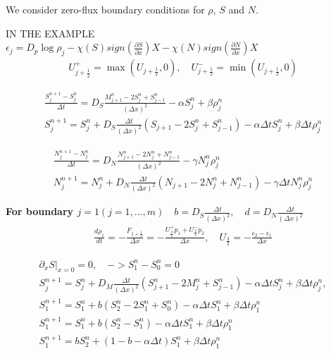 \documentclass[11pt,twoside]{article}
\numberwithin{equation}{section}
\begin{document}
We consider zero-flux boundary conditions for $\rho$, $S$ and $N$.








\iffalse
IN THE EXAMPLE\\
$\epsilon_j=D_p \log \rho_j-\chi(S) sign(\frac{\partial S}{\partial x})X-\chi(N) sign(\frac{\partial N}{\partial x})X$
\begin{eqnarray}
U^+_{j+\frac{1}{2}}=\max(U_{j+\frac{1}{2}},0), \quad U^-_{j+\frac{1}{2}}=\min (U_{j+\frac{1}{2}},0)
\end{eqnarray}

\begin{eqnarray}
\frac{S_j^{n+1}-S_j^n}{\Delta t}=D_S\frac{M_{j+1}^n-2S_j^n+S_{j-1}^n}{(\Delta x)^2}-\alpha S_j^n+\beta \rho_j^n\\
S_j^{n+1}=S_j^n+D_S \frac{\Delta t} {(\Delta x)^2}(S_{j+1}-2S_j^n+S_{j-1}^n)-\alpha \Delta t S_j^n+\beta \Delta t \rho_j^n
\end{eqnarray}


\begin{eqnarray}
\frac{N_j^{n+1}-N_j^n}{\Delta t}=D_N\frac{N_{j+1}^n-2N_j^n+N_{j-1}^n}{(\Delta x)^2}-\gamma N_j^n \rho_j^n\\
N_j^{n+1}=N_j^n+D_N \frac{\Delta t} {(\Delta x)^2}(N_{j+1}-2N_j^n+N_{j-1}^n)-\gamma \Delta t N_j^n \rho_j^n
\end{eqnarray}

\textbf{ For boundary $ j=1(j=1,...,m) \quad b=D_S \frac{\Delta t} {(\Delta x)^2}, \quad d=D_N \frac{\Delta t} {(\Delta x)^2}$}
\begin{eqnarray}
\frac{d\rho_1}{dt}=-\frac{F_{1+\frac{1}{2}}}{\Delta x}=-\frac{U^+_{\frac{3}{2}}p_1+U^-_{\frac{3}{2}}p_2 }{\Delta x}, \quad U_{\frac{3}{2}}=-\frac{\epsilon_2-\epsilon_1}{\Delta x}
\end{eqnarray}

 
\begin{eqnarray}
\partial_x S |_{x=0}= 0, \quad -> S^n_1-S^n_0=0\\
S_j^{n+1}=S_j^n+D_M \frac{\Delta t} {(\Delta x)^2}(S^n_{j+1}-2M_j^n+S_{j-1}^n)-\alpha \Delta t S_j^n+\beta \Delta t \rho_j^n, \\
S_1^{n+1}=S_1^n+b(S^n_{2}-2S_1^n+S_{0}^n)-\alpha \Delta t S_1^n+\beta \Delta t \rho_1^n\\
S_1^{n+1}=S_1^n+b(S^n_{2}-S_1^n)-\alpha \Delta t S_1^n+\beta \Delta t \rho_1^n\\
S_1^{n+1}=bS^n_2+(1-b-\alpha \Delta t)S_1^n+\beta \Delta t \rho_1^n
\end{eqnarray}
\end{document}
